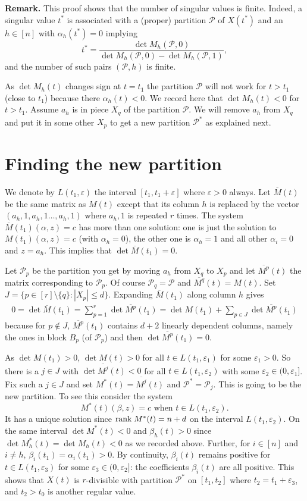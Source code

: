 \documentclass[12pt,a4paper]{amsart}
\newcommand{\al}{\alpha}
\newcommand{\be}{\beta}
\newcommand{\eps}{\varepsilon}
\newcommand{\p}{\mathcal{P}}
\newcommand{\rank}{\textrm{rank\;}}
\numberwithin{equation}{section}
\begin{document}
\smallskip
{\bf Remark.} This proof shows that the number of singular values is finite. Indeed, a singular value $t^*$ is associated with a (proper) partition $\p$ of $X(t^*)$ and an $h \in [n]$ with $\al_h(t^*)=0$ implying 
$$
t^*=\frac {\det M_h(\p,0)}{\det M_h(\p,0)-\det M_h(\p,1)},
$$
and the number of such pairs $(\p,h)$ is finite.

\smallskip
As $\det M_h(t)$ changes sign at $t=t_1$ the partition $\p$ will not work for $t>t_1$ (close to $t_1$) because there $\al_h(t)<0$. We record here that $\det M_h(t)<0$ for $t>t_1$. Assume $a_h$ is in piece $X_q$ of the partition $\p$. We will remove $a_h$ from $X_q$ and put it in some other $X_p$ to get a new partition $\p^*$ as explained next.

\section{Finding the new partition}\label{sec:Xj}

We denote by $L(t_1,\eps)$ the interval $[t_1,t_1+\eps]$ where $\eps>0$ always.
Let $\overline{M}(t)$ be the same matrix as $M(t)$ except that its column $h$ is replaced by the vector $(a_h,1,a_h,1\ldots,a_h,1)$ where $a_h,1$ is repeated $r$ times. The system $\overline{M}(t_1)(\al,z)=c$ has more than one solution: one is just the solution to $M(t_1)(\al,z)=c$ (with $\al_h=0$), the other one is $\al_h=1$ and all other $\al_i=0$ and $z=a_h$. This implies that $\det \overline{M}(t_1)=0.$

\smallskip
Let $\p_p$ be the partition you get by moving $a_h$ from $X_q$ to $X_p$ and let $\overline{M^p}(t)$ the matrix corresponding to $\p_p$. Of course $\p_q=\p$ and $\overline{M^q}(t)=M(t).$ 
Set $J=\{p\in [r]\setminus \{q\}: |X_p|\le d\}.$ Expanding $\overline{M}(t_1)$ along column $h$ gives
\begin{eqnarray*}
0=\det \overline{M}(t_1)=\sum_{p=1}^r \det \overline{M^p}(t_1)
                                     =\det M(t_1)+\sum_{p\in J} \det \overline{M^p}(t_1)
\end{eqnarray*}
because for $p\notin J$, $\overline{M^p}(t_1)$  contains $d+2$ linearly dependent columns, namely the ones in block $B_p$ (of $\p_p$) and then $\det \overline{M^p}(t_1)=0.$

\smallskip
As $\det M(t_1)>0$, $\det M(t)>0$ for all $t \in L(t_1,\eps_1)$ for some $\eps_1>0$. So there is a $j\in J$ with $ \det \overline{M^j}(t)<0$ for all $t \in L(t_1,\eps_2)$ with some $\eps_2\in (0,\eps_1]$. Fix such a $j \in J$ and set $M^*(t)=\overline{M^j}(t)$ and  $\p^*=\p_j$. This is going to be the new partition. To see this consider the system
\[
M^*(t)(\be,z)=c \mbox{ when } t \in L(t_1,\eps_2).
\]
It has a unique solution since $\rank M^*(t)=n+d$ on the interval $ L(t_1,\eps_2).$ On the same interval $\det M^*(t)<0$ and $\be_h(t)>0$ since $\det M_h^*(t)=\det M_h(t)<0$ as we recorded above. Further, for $i\in [n]$ and $i\ne h$, $\be_i(t_1)=\al_i(t_1)>0$. By continuity, $\be_i(t)$ remains positive for $t\in L(t_1,\eps_3)$ for some $\eps_3\in (0,\eps_2]$: the coefficients $\be_i(t)$ are all positive. This shows that $X(t)$ is $r$-divisible with partition $\p^*$ on $[t_1,t_2]$ where $t_2=t_1+\eps_3$, and  $t_2>t_0$ is another regular value.
\end{document}
